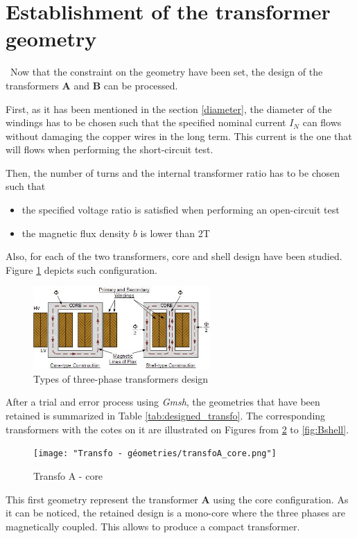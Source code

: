 \documentclass[12pt,a4paper]{report}
\begin{document}
\section{Establishment of the transformer geometry}
\quad\, Now that the constraint on the geometry have been set, the design of the transformers \textbf{A} and \textbf{B} can be processed. 

First, as it has been mentioned in the section \ref{diameter}, the diameter of the windings has to be chosen such that the specified nominal current $I_N$ can flows without damaging the copper wires in the long term. 
This current is the one that will flows when performing the short-circuit test. 

Then, the number of turns and the internal transformer ratio has to be chosen such that
\begin{itemize}
    \item the specified voltage ratio is satisfied when performing an open-circuit test
    \item the magnetic flux density $b$ is lower than 2T
\end{itemize}

Also, for each of the two transformers, core and shell design have been studied. Figure \ref{fig:shell_core_type} depicts such configuration.

 \begin{figure}[h]
    \centering
    \includegraphics[width=0.6\textwidth]{type_design_2.jpg}
    \caption{Types of three-phase transformers design}
    \label{fig:shell_core_type}
\end{figure}


After a trial and error process using \textit{Gmsh}, the geometries that have been retained is summarized in Table \ref{tab:designed_transfo}. The corresponding transformers with the cotes on it are illustrated on Figures from \ref{fig:Acore} to \ref{fig:Bshell}. 

\begin{figure}[h]
    \centering
    \texttt{[image: "Transfo - géometries/transfoA\_core.png"]}
    \caption{Transfo A - core}
    \label{fig:Acore}
\end{figure}
This first geometry represent the transformer \textbf{A} using the core configuration. As it can be noticed, the retained design is a mono-core where the three phases are magnetically coupled. This allows to produce a compact transformer. 
\end{document}
